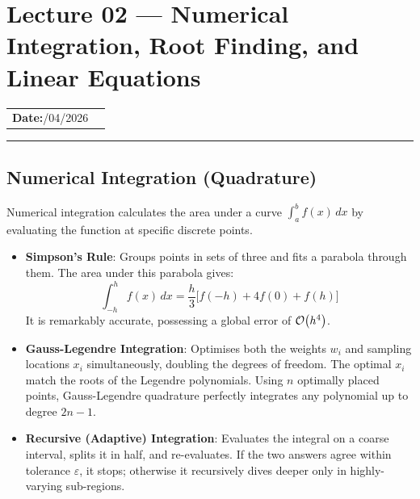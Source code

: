
\section{Lecture 02 — Numerical Integration, Root Finding, and Linear
  Equations}\label{sec:lec02}

\begin{center}
\begin{tabular}{ll}
  \textbf{Date:}\quad 12/04/2026 & \\
\end{tabular}
\end{center}
\hrule\vspace{1.5em}

\subsection{Numerical Integration (Quadrature)}
Numerical integration calculates the area under a curve $\int_a^b f(x)\, dx$
by evaluating the function at specific discrete points.

\begin{itemize}
    \item \textbf{Simpson's Rule}: Groups points in sets of three and fits a
    parabola through them. The area under this parabola gives:
    \begin{equation}
    \int_{-h}^{h} f(x)\, dx = \frac{h}{3}\bigl[f(-h) + 4f(0) + f(h)\bigr]
    \end{equation}
    It is remarkably accurate, possessing a global error of $\mathcal{O}\!\left(h^4\right)$.

    \item \textbf{Gauss-Legendre Integration}: Optimises both the weights
    $w_i$ and sampling locations $x_i$ simultaneously, doubling the degrees
    of freedom. The optimal $x_i$ match the roots of the Legendre polynomials.
    Using $n$ optimally placed points, Gauss-Legendre quadrature perfectly
    integrates any polynomial up to degree $2n-1$.

    \item \textbf{Recursive (Adaptive) Integration}: Evaluates the integral on
    a coarse interval, splits it in half, and re-evaluates. If the two answers
    agree within tolerance $\varepsilon$, it stops; otherwise it recursively
    dives deeper only in highly-varying sub-regions.
\end{itemize}

